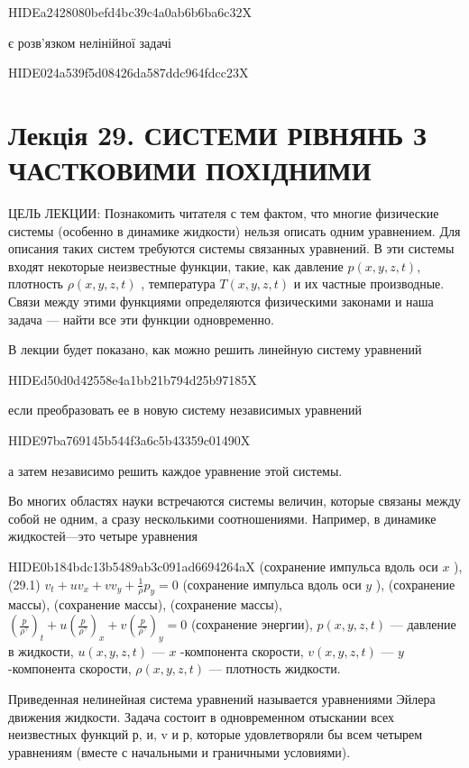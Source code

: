 \documentclass[
  ukrainian,
]{article}
\begin{document}
HIDEa2428080befd4bc39c4a0ab6b6ba6c32X

є розв'язком нелінійної задачі

HIDE024a539f5d08426da587ddc964fdcc23X

\section{Лекція 29. СИСТЕМИ РІВНЯНЬ З ЧАСТКОВИМИ
ПОХІДНИМИ}\label{ux43bux435ux43aux446ux456ux44f-29.-ux441ux438ux441ux442ux435ux43cux438-ux440ux456ux432ux43dux44fux43dux44c-ux437-ux447ux430ux441ux442ux43aux43eux432ux438ux43cux438-ux43fux43eux445ux456ux434ux43dux438ux43cux438}

ЦЕЛЬ ЛЕКЦИИ: Познакомить читателя с тем фактом, что многие физические
системы (особенно в динамике жидкости) нельзя описать одним уравнением.
Для описания таких систем требуются системы связанных уравнений. В эти
системы входят некоторые неизвестные функции, такие, как давление
\(p(x, y, z, t)\), плотность \(\rho(x, y, z, t)\) , температура
\(T(x, y, z, t)\) и их частные производные. Связи между этими функциями
определяются физическими законами и наша задача --- найти все эти
функции одновременно.

В лекции будет показано, как можно решить линейную систему уравнений

HIDEd50d0d42558e4a1bb21b794d25b97185X

если преобразовать ее в новую систему независимых уравнений

HIDE97ba769145b544f3a6c5b43359c01490X

а затем независимо решить каждое уравнение этой системы.

Во многих областях науки встречаются системы величин, которые связаны
между собой не одним, а сразу несколькими соотношениями. Например, в
динамике жидкостей---это четыре уравнения

HIDE0b184bdc13b5489ab3c091ad6694264aX (сохранение импульса вдоль оси
\(x\) ), (29.1) \(v_t + uv_x + vv_y + \frac{1}{\rho} p_y = 0\)
(сохранение импульса вдоль оси \(y\) ), (сохранение массы), (сохранение
массы), (сохранение массы),
\(\left(\frac{p}{\rho^{\gamma}}\right)_t + u\left(\frac{p}{\rho^{\gamma}}\right)_x + v\left(\frac{p}{\rho^{\gamma}}\right)_y = 0\)
(сохранение энергии), \(p(x, y, z, t)\) --- давление в жидкости,
\(u(x, y, z, t)\) --- \(x\) -компонента скорости, \(v(x, y, z, t)\) ---
\(y\) -компонента скорости, \(\rho(x, y, z, t)\) --- плотность жидкости.

Приведенная нелинейная система уравнений называется уравнениями Эйлера
движения жидкости. Задача состоит в одновременном отыскании всех
неизвестных функций р, и, v и р, которые удовлетворяли бы всем четырем
уравнениям (вместе с начальными и граничными условиями).
\end{document}
